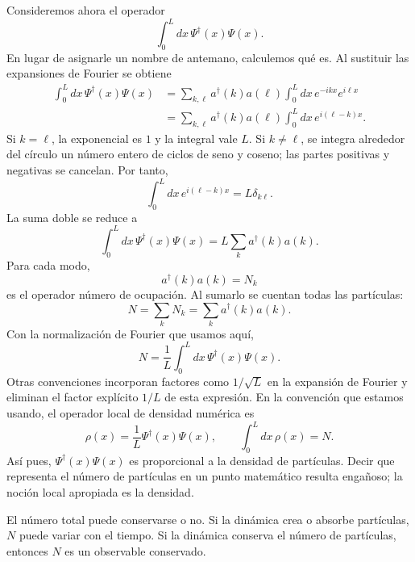 Consideremos ahora el operador
\begin{equation}
\int_0^L dx\,\Psi^\dagger(x)\Psi(x).
\end{equation}
En lugar de asignarle un nombre de antemano, calculemos qué es. Al sustituir las expansiones de Fourier se obtiene
\begin{align}
\int_0^L dx\,\Psi^\dagger(x)\Psi(x)
&=
\sum_{k,\ell}a^\dagger(k)a(\ell)
\int_0^L dx\,e^{-ikx}e^{i\ell x}
\\
&=
\sum_{k,\ell}a^\dagger(k)a(\ell)
\int_0^L dx\,e^{i(\ell-k)x}.
\end{align}
Si \(k=\ell\), la exponencial es \(1\) y la integral vale \(L\). Si \(k\ne\ell\), se integra alrededor del círculo un número entero de ciclos de seno y coseno; las partes positivas y negativas se cancelan. Por tanto,
\begin{equation}
\int_0^L dx\,e^{i(\ell-k)x}=L\delta_{k\ell}.
\end{equation}
La suma doble se reduce a
\begin{equation}
\int_0^L dx\,\Psi^\dagger(x)\Psi(x)
=L\sum_k a^\dagger(k)a(k).
\end{equation}
Para cada modo,
\begin{equation}
a^\dagger(k)a(k)=N_k
\end{equation}
es el operador número de ocupación. Al sumarlo se cuentan todas las partículas:
\begin{equation}
N=\sum_k N_k=\sum_k a^\dagger(k)a(k).
\end{equation}
Con la normalización de Fourier que usamos aquí,
\begin{equation}
N=\frac{1}{L}\int_0^L dx\,
\Psi^\dagger(x)\Psi(x).
\end{equation}
Otras convenciones incorporan factores como \(1/\sqrt{L}\) en la expansión de Fourier y eliminan el factor explícito \(1/L\) de esta expresión. En la convención que estamos usando, el operador local de densidad numérica es
\begin{equation}
\rho(x)=\frac{1}{L}\Psi^\dagger(x)\Psi(x),
\qquad
\int_0^L dx\,\rho(x)=N.
\end{equation}
Así pues, \(\Psi^\dagger(x)\Psi(x)\) es proporcional a la densidad de partículas. Decir que representa el número de partículas en un punto matemático resulta engañoso; la noción local apropiada es la densidad.

El número total puede conservarse o no. Si la dinámica crea o absorbe partículas, \(N\) puede variar con el tiempo. Si la dinámica conserva el número de partículas, entonces \(N\) es un observable conservado.

